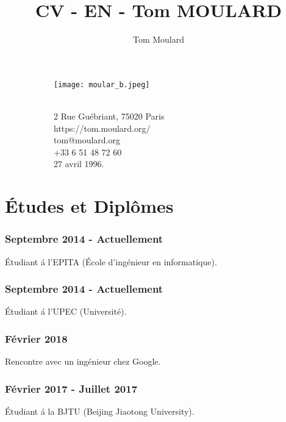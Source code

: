 \documentclass{article}
\begin{document}
    \title{CV - EN - Tom MOULARD}
    \author{Tom Moulard}

    \begin{center}
        \begin{figure}
            \centering
            \begin{subfigure}[b]{0.3\textwidth}
                \texttt{[image: moular\_b.jpeg]}
            \end{subfigure}
            \begin{subfigure}[b]{0.3\textwidth}
                {\huge\bfseries\theauthor}\\
                2 Rue Gu\'ebriant, 75020 Paris\\
                https://tom.moulard.org/\\
                tom@moulard.org\\
                +33 6 51 48 72 60\\
                27 avril 1996.
            \end{subfigure}
        \end{figure}
    \end{center}
\vspace{-1cm}
    \section{\'Etudes et Dipl\^omes}
        \subsubsection{Septembre 2014 - Actuellement}
            \'Etudiant \'a l'EPITA (\'Ecole d'ing\'enieur en informatique).
        \subsubsection{Septembre 2014 - Actuellement}
            \'Etudiant \'a l'UPEC (Universit\'e).
        \subsubsection{F\'evrier 2018}
            Rencontre avec un ing\'enieur chez Google.
        \subsubsection{F\'evrier 2017 - Juillet 2017}
            \'Etudiant \'a la BJTU (Beijing Jiaotong University).
\end{document}
